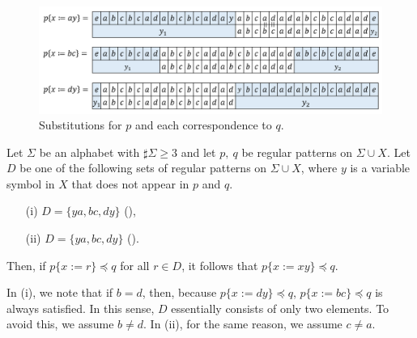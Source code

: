 \begin{figure}[t]
  \begin{center}
  \includegraphics[scale=0.45]{figs/Exam_b=a_c=d.png}
  \end{center}
  \caption{Substitutions for $p$ and each correspondence to $q$.}
  \label{fig:cex-bacd}
\end{figure}

\begin{lem}\label{lem:oneside}
Let $\Sigma$ be an alphabet with $\sharp\Sigma \ge 3$ and let $p,~q$ be regular patterns on $\Sigma\cup X$.
Let $D$ be one of the following sets of regular patterns on $\Sigma\cup X$, where $y$ is a variable symbol in $X$ that does not appear in $p$ and $q$.
\begin{enumerate}
\item[{\rm (i)}] $D=\{ ya, bc, dy \}$ (\TheConditionB),
\item[{\rm (ii)}] $D=\{ ya, bc, dy \}$ (\TheConditionC).
\end{enumerate}
Then, if $p \{ x := r \} \preceq q$ for all $r \in D$, it follows that $p \{ x := xy \} \preceq q$.
\end{lem}

In {\rm (i)}, we note that if $b = d$, then, because $p\{x:=dy\}\preceq q$, $p\{x:=bc\}\preceq q$ is always satisfied.
In this sense, $D$ essentially consists of only two elements.
To avoid this, we assume $b \not= d$.
In {\rm (ii)}, for the same reason, we assume $c\not= a$. 

\medskip

